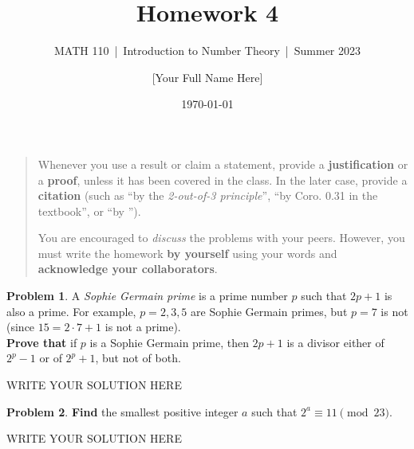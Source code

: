\documentclass[11pt]{article}
\title{Homework 4}
\author{[Your Full Name Here]}
\subtitle{MATH 110~|~Introduction to Number Theory~|~Summer 2023}
\date{\today}
\theoremstyle{plain}
\theoremstyle{definition}
\newtheorem{problem}{Problem}
\theoremstyle{remark}
\numberwithin{equation}{problem}
\begin{document}
\maketitle

\begin{quotation}
	Whenever you use a result or claim a statement, provide a \textbf{justification} or a \textbf{proof}, unless it has been covered in the class. In the later case, provide a \textbf{citation} (such as ``by the \emph{2-out-of-3 principle}'', ``by Coro. 0.31 in the textbook'', or ``by \cite[Coro. 0.31]{texbook}'').

	You are encouraged to \emph{discuss} the problems with your peers. However, you must write the homework \textbf{by yourself} using your words and \textbf{acknowledge your collaborators}.
\end{quotation}


\begin{problem}
  A \emph{Sophie Germain prime} is a prime number $p$ such that $2p + 1$ is also a prime. For example, $p = 2, 3, 5$ are Sophie Germain primes, but $p = 7$ is not (since $15 = 2\cdot 7 + 1$ is not a prime).\\
  \textbf{Prove that} if $p$ is a Sophie Germain prime, then $2p + 1$ is a divisor either of $2^p - 1$ or of $2^p + 1$, but not of both.
\begin{solution} %
WRITE YOUR SOLUTION HERE
\end{solution}\clearpage %
\end{problem}

\begin{problem}\label{Problem 14.2}
  \textbf{Find} the smallest positive integer $a$ such that $2^a \equiv 11 \pmod{23}$.
\begin{solution} %
WRITE YOUR SOLUTION HERE
\end{solution}\clearpage %
\end{problem}
\end{document}
